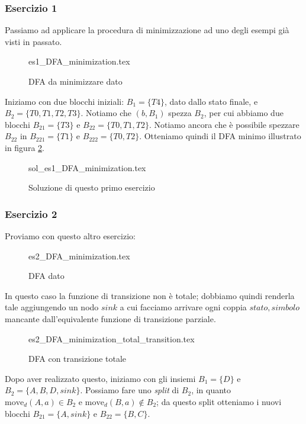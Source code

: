 \documentclass[class=book, crop=false, oneside, 12pt]{standalone}
\begin{document}
\subsubsection{Esercizio 1}
Passiamo ad applicare la procedura di minimizzazione ad uno degli esempi già visti in passato.

\begin{figure}[H]
	\centering
    {es1_DFA_minimization.tex}
	\caption{DFA da minimizzare dato}
	\label{mindfa-es-1}
\end{figure}

Iniziamo con due blocchi iniziali: \(B_{1}=\{T4\}\), dato dallo stato finale, e \(B_{2}=\{T0,T1,T2,T3\}\). Notiamo che \((b,B_{1})\) spezza \(B_{2}\), per cui abbiamo due blocchi \(B_{21}=\{T3\}\) e \(B_{22}=\{T0,T1,T2\}\). Notiamo ancora che è possibile spezzare \(B_{22}\) in \(B_{221}=\{T1\}\) e \(B_{222}=\{T0,T2\}\). Otteniamo quindi il DFA minimo illustrato in figura \ref{mindfa-es1-sol}. 

\begin{figure}[H]
	\centering
    {sol_es1_DFA_minimization.tex}
	\caption{Soluzione di questo primo esercizio}
  \label{mindfa-es1-sol}
\end{figure}

\subsubsection{Esercizio 2}
\label{subsec:dfa-minimization}
Proviamo con questo altro esercizio:
\begin{figure}[H]
	\centering
    {es2_DFA_minimization.tex}
	\caption{DFA dato}
  \label{mindfa-es-2}
\end{figure}
In questo caso la funzione di transizione non è totale; dobbiamo quindi renderla tale aggiungendo un nodo \(sink\) a cui facciamo arrivare ogni coppia \(stato, simbolo\) mancante dall'equivalente funzione di transizione parziale.
\begin{figure}[H]
	\centering
    {es2_DFA_minimization_total_transition.tex}
	\caption{DFA con transizione totale}
  \label{minndfa-es-2-tot}
\end{figure}
Dopo aver realizzato questo, iniziamo con gli insiemi \(B_{1}=\{D\}\) e \(B_{2}=\{A,B,D,sink\}\). Possiamo fare uno \emph{split} di \(B_{2}\), in quanto \(\textrm{move}_{d}(A,a) \in B_{2} \) e \(\textrm{move}_{d}(B,a) \notin B_{2} \); da questo split otteniamo i nuovi blocchi \(B_{21}=\{A,sink\}\) e \(B_{22}=\{B,C\}\).
\end{document}
